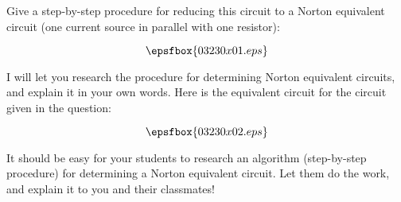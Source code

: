 

Give a step-by-step procedure for reducing this circuit to a Norton equivalent circuit (one current source in parallel with one resistor):

$$\epsfbox{03230x01.eps}$$







I will let you research the procedure for determining Norton equivalent circuits, and explain it in your own words.  Here is the equivalent circuit for the circuit given in the question:

$$\epsfbox{03230x02.eps}$$







It should be easy for your students to research an algorithm (step-by-step procedure) for determining a Norton equivalent circuit.  Let them do the work, and explain it to you and their classmates!




